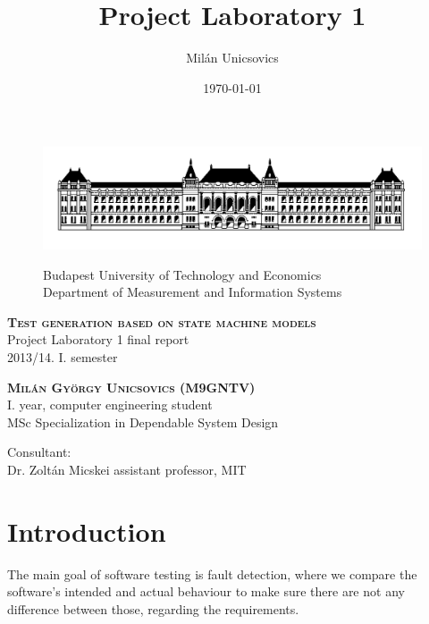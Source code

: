 \documentclass{article}
\author{Milán Unicsovics}
\title{Project Laboratory 1}
\date{\today}
\begin{document}
\begin{titlepage}

\begin{figure}[htp]
\centering
\includegraphics[scale=0.3]{img/bme.png}
\begin{center}
Budapest University of Technology and Economics\\
Department of Measurement and Information Systems
\end{center}
\end{figure}

\vspace{3cm}
\begin{center}
\textsc{\LARGE \textbf{Test generation based on state machine models}}
\vspace{0.5cm}\\
Project Laboratory 1 final report\\
2013/14. I. semester

\vspace{3cm}
\textsc{\large \textbf{Milán György Unicsovics (M9GNTV)}}
\vspace{0.5cm}\\
I. year, computer engineering student\\
MSc Specialization in Dependable System Design

\vspace*{\fill}

Consultant:\\
Dr. Zoltán Micskei assistant professor, MIT\\[0.3cm]

\end{center}

\end{titlepage}
%
\tableofcontents
\newpage

\section{Introduction}
\label{sec:intro}

The main goal of software testing is fault detection, where we compare the software's intended and actual behaviour to make sure there are not any difference between those, regarding the requirements.
\end{document}
